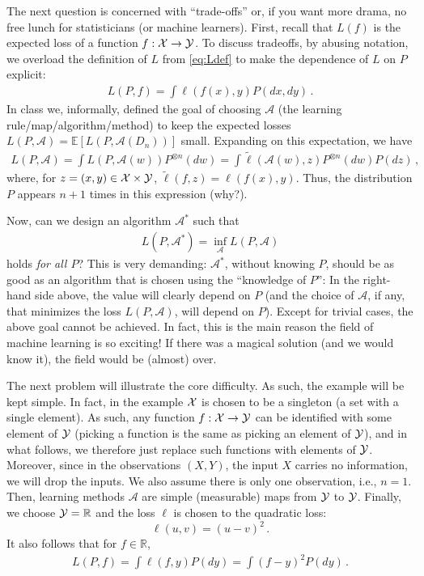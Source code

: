 \documentclass{article}
\newcommand{\R}{\mathbb{R}}
\DeclareMathOperator*{\1}{\mathbbm{1}}
\newcommand{\E}{\mathbb E}
\newcommand{\EE}[1]{\E[#1]}
\theoremstyle{definition}
\theoremstyle{remark}
\newcommand{\cA}{\mathcal{A}}
\begin{document}
The next question is concerned with ``trade-offs'' or, if you want more drama, no free lunch for statisticians (or machine learners).
First, recall that $L(f)$ is the expected loss of a function $f:\mathcal{X} \to \mathcal{Y}$.
To discuss tradeoffs, by abusing notation, we overload the definition of $L$ from \cref{eq:Ldef} to make the dependence of $L$ on $P$ explicit:
\begin{align*}
L(P,f) = \int \ell( f(x),y) P(dx,dy)\,.
\end{align*}
In class we, informally, defined the goal of choosing $\cA$ (the learning rule/map/algorithm/method) to keep the expected losses $L(P,\cA)=\EE{L(P,\cA(D_n))}$ small.
Expanding on this expectation, we have
\begin{align*}
L(P,\cA) = \int L(P,\cA(w)) P^{\otimes n}(dw)
= \int \tilde{\ell}( \cA(w), z ) P^{\otimes n}(dw) P(dz)\,,
\end{align*}
where, for $z=(x,y)\in \mathcal{X}\times \mathcal{Y}$, $\tilde{\ell}(f,z) = \ell(f(x),y)$.
Thus, the distribution $P$ appears $n+1$ times in this expression (why?).

Now, can we design an algorithm $\cA^*$ such that 
\begin{align*}
L(P,\cA^*) = \inf_{\cA} L(P,\cA)
\end{align*}
holds \emph{for all $P$}?
This is very demanding: $\cA^*$, without knowing $P$, should be as good as an algorithm that is chosen using the ``knowledge of $P$'': In the right-hand side above, the value will clearly depend on $P$ (and the choice of $\cA$, if any, that minimizes the loss $L(P,\cA)$, will depend on $P$).
Except for trivial cases, the above goal cannot be achieved. In fact, this is the main reason the field of machine learning is so exciting! If there was a magical solution (and we would know it), the field would be (almost) over.

The next problem will illustrate the core difficulty. As such, the example will be kept simple.
In fact, in the example $\mathcal{X}$ is chosen to be a singleton (a set with a single element).
As such, any function $f:\mathcal{X}\to \mathcal{Y}$ can be identified with some element of $\mathcal{Y}$ (picking a function is the same as picking an element of $\mathcal{Y}$), and in what follows, we therefore just replace such functions with elements of $\mathcal{Y}$. Moreover, since in the observations $(X,Y)$, the input $X$ carries no information, we will drop the inputs. We also assume there is only one observation, i.e., $n=1$.
Then, learning methods $\cA$ are  simple (measurable) maps from $\mathcal{Y}$ to $\mathcal{Y}$.
Finally, we choose $\cY=\R$ and
the loss $\ell$ is chosen to the quadratic loss: 
\[
\ell(u,v) = (u-v)^2\,.
\]
It also follows that for $f\in \R$, 
\begin{align}
L(P,f) = \int \ell( f,y) P(dy) = \int (f-y)^2 P(dy)\,. 
\label{eq:qloss}
\end{align}
\end{document}
